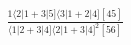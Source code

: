 \documentclass[varwidth, border=5pt]{standalone}
\begin{document}
\begin{my}
$\begin{gathered}
\scriptscriptstyle\frac{1⟨2|1+3|5]⟨3|1+2|4][45]}{⟨1|2+3|4]⟨2|1+3|4]^2[56]}
\end{gathered}$
\end{my}
\end{document}
